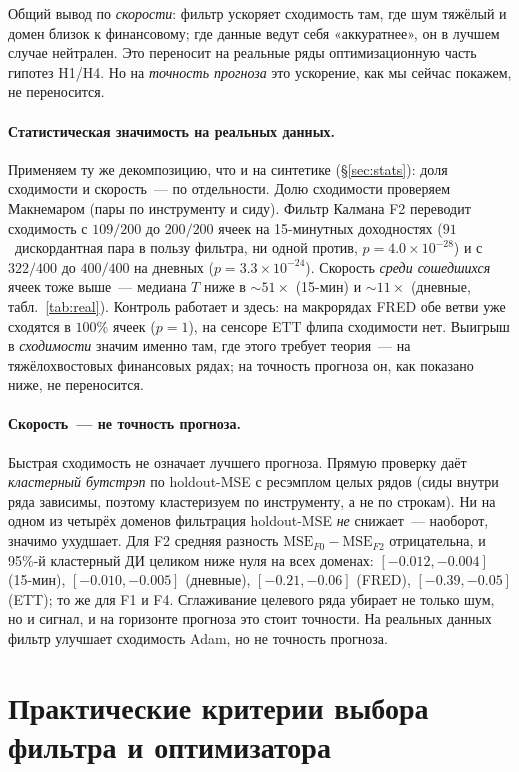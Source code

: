 \documentclass[conference]{IEEEtran}
\begin{document}
Общий вывод по \emph{скорости}: фильтр ускоряет сходимость там, где шум
тяжёлый и домен близок к финансовому; где данные ведут себя «аккуратнее»,
он в лучшем случае нейтрален. Это переносит на реальные ряды
оптимизационную часть гипотез H1/H4. Но на \emph{точность прогноза} это
ускорение, как мы сейчас покажем, не переносится.

\paragraph{Статистическая значимость на реальных данных.} Применяем ту же
декомпозицию, что и на синтетике (§\ref{sec:stats}): доля сходимости и
скорость~--- по отдельности. Долю сходимости проверяем Макнемаром (пары по
инструменту и сиду). Фильтр Калмана F2 переводит сходимость с $109/200$ до
$200/200$ ячеек на 15-минутных доходностях ($91$~дискордантная пара в пользу
фильтра, ни одной против, $p=4.0\times10^{-28}$) и с $322/400$ до $400/400$ на
дневных ($p=3.3\times10^{-24}$). Скорость \emph{среди сошедшихся} ячеек тоже
выше~--- медиана $T$ ниже в ${\sim}51\times$ (15-мин) и ${\sim}11\times$
(дневные, табл.~\ref{tab:real}). Контроль работает и здесь: на макрорядах FRED
обе ветви уже сходятся в $100\%$ ячеек ($p=1$), на сенсоре ETT флипа сходимости
нет. Выигрыш в \emph{сходимости} значим именно там, где этого требует
теория~--- на тяжёлохвостовых финансовых рядах; на точность прогноза он, как
показано ниже, не переносится.

\paragraph{Скорость~--- не точность прогноза.} Быстрая сходимость не
означает лучшего прогноза. Прямую проверку даёт \emph{кластерный бутстрэп} по
holdout-MSE с ресэмплом целых рядов (сиды внутри ряда зависимы, поэтому
кластеризуем по инструменту, а не по строкам). Ни на
одном из четырёх доменов фильтрация holdout-MSE \emph{не} снижает~---
наоборот, значимо ухудшает. Для F2 средняя разность
$\text{MSE}_{F0}-\text{MSE}_{F2}$ отрицательна, и 95\%-й кластерный ДИ
целиком ниже нуля на всех доменах: $[-0.012,-0.004]$ (15-мин),
$[-0.010,-0.005]$ (дневные), $[-0.21,-0.06]$ (FRED), $[-0.39,-0.05]$ (ETT);
то же для F1 и F4. Сглаживание целевого ряда убирает не только шум, но и
сигнал, и на горизонте прогноза это стоит точности. На реальных данных
фильтр улучшает сходимость Adam, но не точность прогноза.

\section{Практические критерии выбора фильтра и оптимизатора}
\label{sec:practice}
\end{document}
